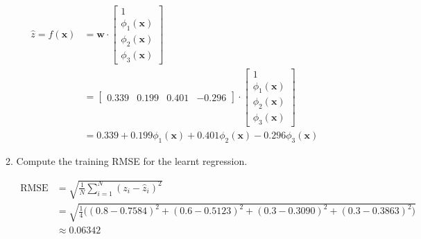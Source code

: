 \documentclass[12pt]{article}
\begin{document}
\begin{enumerate}[leftmargin=\labelsep]
\begin{enumerate}
        \begin{equation}
        \begin{split}
            \hat{z} = f(\mathbf{x}) &= \mathbf{w} \cdot
            \begin{bmatrix}
                1 \\
                \phi_1(\mathbf{x}) \\
                \phi_2(\mathbf{x}) \\
                \phi_3(\mathbf{x})
            \end{bmatrix} \\
            &= \begin{bmatrix}
                0.339 & 0.199 & 0.401 & -0.296
            \end{bmatrix} \cdot \begin{bmatrix}
                1 \\
                \phi_1(\mathbf{x}) \\
                \phi_2(\mathbf{x}) \\
                \phi_3(\mathbf{x})
            \end{bmatrix} \\
            &= 0.339 + 0.199\phi_1(\mathbf{x}) + 0.401\phi_2(\mathbf{x}) - 0.296\phi_3(\mathbf{x})
        \end{split}
        \end{equation}

        \item Compute the training RMSE for the learnt regression.
        
        \begin{equation}
        \begin{split}
            \textrm{RMSE} &= \sqrt{\frac{1}{N}\sum_{i=1}^{N}(z_i-\hat{z}_i)^2} \\
            &= \sqrt{\frac{1}{4}\biggl( (0.8-0.7584)^2 + (0.6-0.5123)^2 + (0.3-0.3090)^2 + (0.3-0.3863)^2\biggr)} \\
            &\approx 0.06342
        \end{split}
        \end{equation}
    \end{enumerate}


\end{enumerate}
\end{document}
